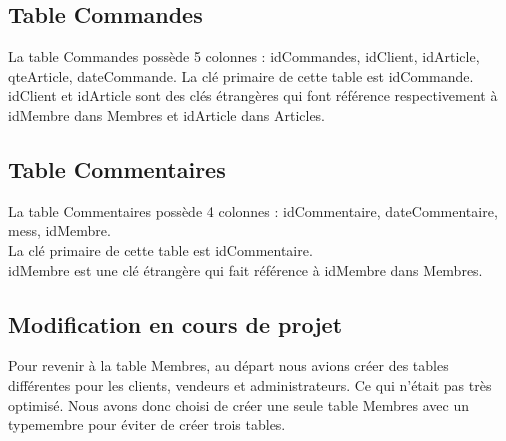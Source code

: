 \documentclass[11pt,a4paper]{article}
\begin{document}
	\subsection{Table Commandes}
	
	La table Commandes poss\`ede 5 colonnes : idCommandes, idClient, idArticle, qteArticle, dateCommande.
	La cl\'e primaire de cette table est idCommande.\\
	idClient et idArticle sont des cl\'es \'etrang\`eres qui font r\'ef\'erence respectivement \`a idMembre dans Membres et idArticle dans Articles.
		
	\subsection{Table Commentaires}
	
	La table Commentaires poss\`ede 4 colonnes : idCommentaire, dateCommentaire, mess, idMembre.\\
	La cl\'e primaire de cette table est idCommentaire.\\
	idMembre est une cl\'e \'etrang\`ere qui fait r\'ef\'erence \`a idMembre dans Membres.
	
	\subsection{Modification en cours de projet}
	
	Pour revenir \`a la table Membres, au d\'epart nous avions cr\'eer des tables diff\'erentes pour les clients, vendeurs et administrateurs. Ce qui n'\'etait pas tr\`es optimis\'e. Nous avons donc choisi de cr\'eer une seule table Membres avec un typemembre pour \'eviter de cr\'eer trois tables.
	
	
	
\end{document}
